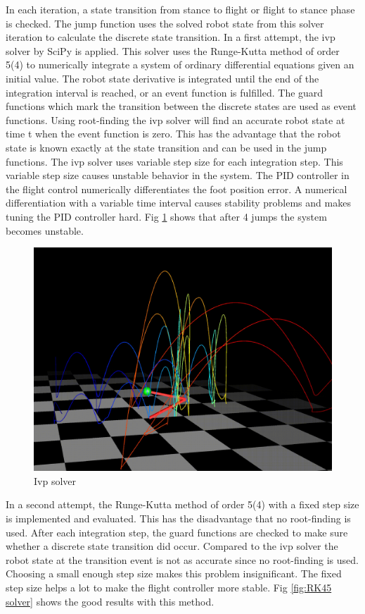 \documentclass[10pt,conference]{IEEEtran}
\begin{document}
In each iteration, a state transition from stance to flight or flight to stance phase is checked. The jump function uses the solved robot state from this solver iteration 
to calculate the discrete state transition. 
In a first attempt, the ivp solver by SciPy is applied. This solver uses the Runge-Kutta method of order 5(4) to numerically integrate a system of ordinary differential 
equations given an initial value. The robot state derivative is integrated until the end of the integration interval is reached, or an event function is 
fulfilled.  The guard functions which mark the transition between the discrete states are used as event functions. Using root-finding the ivp solver will find an 
accurate robot state at time t when the event function is zero. This has the advantage that the robot state is known exactly at the state transition and can be used 
in the jump functions. The ivp solver uses variable step size for each integration step. This variable step size causes unstable behavior in the system. The PID 
controller in the flight control numerically differentiates the foot position error. A numerical differentiation with a variable time interval causes stability 
problems and makes tuning the PID controller hard. Fig \ref{fig:ivp solver} shows that after 4 jumps the system becomes unstable.

\begin{figure}[h]
   \centering
   \includegraphics[scale=0.11]{"assets/solver_ivp.png"}
   \caption{Ivp solver}
   \label{fig:ivp solver}
\end{figure}

In a second attempt, the Runge-Kutta method of order 5(4) with a fixed step size is implemented and evaluated. This has the disadvantage that no root-finding is used. 
After each integration step, the guard functions are checked to make sure whether a discrete state transition did occur. Compared to the ivp solver the robot state at 
the transition event is not as accurate since no root-finding is used. Choosing a small enough step size makes this problem insignificant. The fixed step size helps 
a lot to make the flight controller more stable. Fig \ref{fig:RK45 solver} shows the good results with this method.
\end{document}
